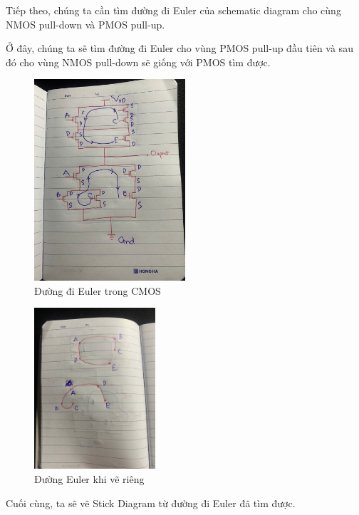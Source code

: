 \documentclass[a4paper,12pt]{article}
\begin{document}
Tiếp theo, chúng ta cần tìm đường đi Euler của schematic diagram cho cùng NMOS pull-down và PMOS pull-up.

Ở đây, chúng ta sẽ tìm đường đi Euler cho vùng PMOS pull-up đầu tiên và sau đó cho vùng NMOS pull-down sẽ giống với PMOS tìm được.

\begin{figure}[H]
    \centering
    \includegraphics[width=0.5\textwidth]{../PNG/Euler_CMOS.jpg}
    \caption{Đường đi Euler trong CMOS}
    \label{fig:Euler_CMOS}
\end{figure}

\begin{figure}[H]
    \centering
    \includegraphics[width=0.4\textwidth]{../PNG/Euler_alone.jpg}
    \caption{Đường Euler khi vẽ riêng}
    \label{fig:Euler}
\end{figure}

Cuối cùng, ta sẽ vẽ Stick Diagram từ đường đi Euler đã tìm được.    
\end{document}
